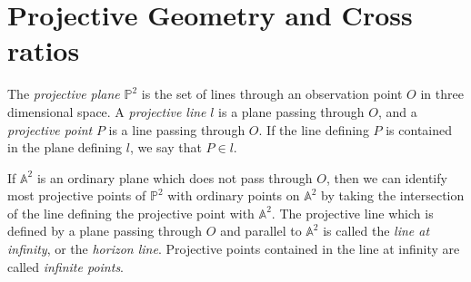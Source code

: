 \section{Projective Geometry and Cross ratios}

\begin{defn} The \emph{projective plane} $\mathbb{P}^2$ is the set of lines through an observation point $O$ in three dimensional space. A \emph{projective line} $l$ is a plane passing through $O$, and a \emph{projective point} $P$ is a line passing through $O$. If the line defining $P$ is contained in the plane defining $l$, we say that $P\in l$.
\end{defn}

If $\mathbb{A}^2$ is an ordinary plane which does not pass through $O$, then we can identify most projective points of $\mathbb{P}^2$ with ordinary points on $\mathbb{A}^2$ by taking the intersection of the line defining the projective point with $\mathbb{A}^2$. The projective line which is defined by a plane passing through $O$ and parallel to $\mathbb{A}^2$ is called the \emph{line at infinity}, or the \emph{horizon line}. Projective points contained in the line at infinity are called \emph{infinite points}.

